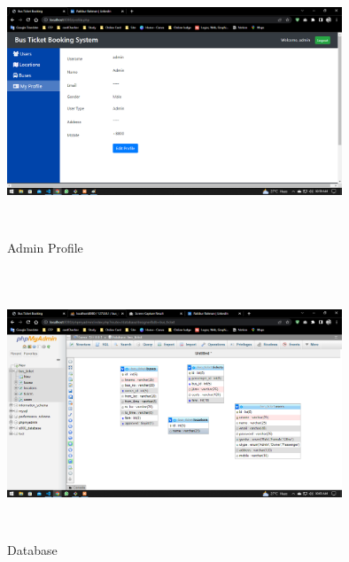 \documentclass[runningheads]{llncs}
\begin{document}
\begin{figure}[h]
    \centering
  \includegraphics[width=10cm,height=8cm]{img/admin profile view.png}
    \caption{Admin Profile}
    \label{fig:my_label}
\end{figure}
\newpage
\begin{figure}[h]
    \centering
    \includegraphics[width=10cm,height=8cm]{img/database.png}
    \caption{Database}
    \label{fig:my_label}
\end{figure}
\end{document}
